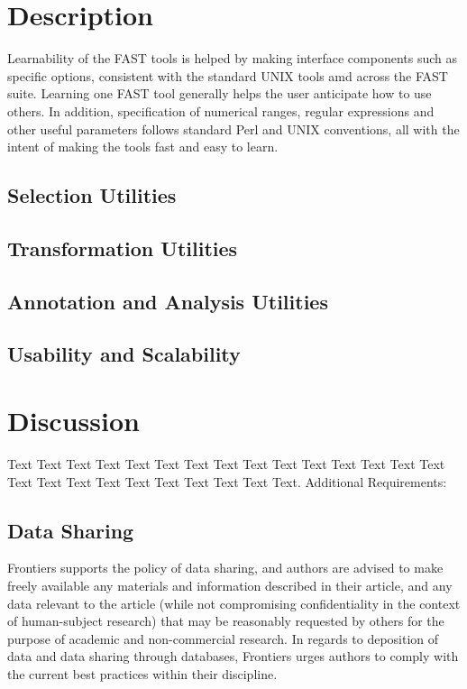 \documentclass{frontiersSCNS} %
\begin{document}
\section{Description}

Learnability of the FAST tools is helped by making interface
components such as specific options, consistent with the standard UNIX
tools amd across the FAST suite. Learning one FAST tool generally
helps the user anticipate how to use others. In addition,
specification of numerical ranges, regular expressions and other
useful parameters follows standard Perl and UNIX conventions, all with
the intent of making the tools fast and easy to learn.

\subsection{Selection Utilities}

\subsection{Transformation Utilities}


\subsection{Annotation and Analysis Utilities}
\subsection{Usability and Scalability}


\section{Discussion}

Text Text Text Text Text Text  Text Text Text Text Text Text Text Text Text  Text Text Text Text Text Text Text Text Text Text.
Additional Requirements:
\subsection{Data Sharing}

Frontiers supports the policy of data sharing, and authors are advised to make freely available any materials and information described in their article, and any data relevant to the article (while not compromising confidentiality in the context of human-subject research) that may be reasonably requested by others for the purpose of academic and non-commercial research. In regards to deposition of data and data sharing through databases, Frontiers urges authors to comply with the current best practices within their discipline.
\end{document}
